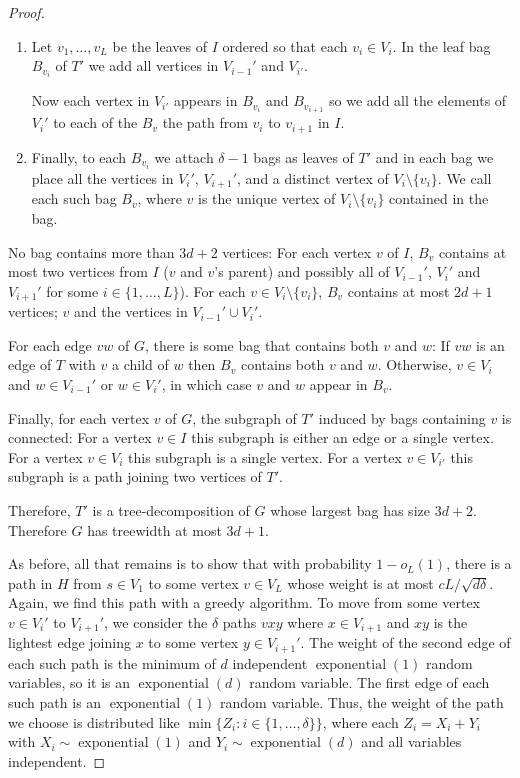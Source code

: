 \documentclass{patmorin}
\DeclareMathOperator{\exponential}{exponential}
\begin{document}
\begin{proof}
\begin{enumerate}
    \item Let $v_1,\ldots,v_L$ be the
     leaves of $I$ ordered so that each $v_i\in V_i$. In the leaf bag
     $B_{v_i}$ of $T'$ we add all vertices in
     $V_{i-1}'$ and $V_{i'}$.

     Now each vertex in $V_{i'}$ appears in $B_{v_i}$ and $B_{v_{i+1}}$
     so we add all the elements of $V_i'$ to each of the $B_v$ the path
     from $v_i$ to $v_{i+1}$ in $I$.

    \item  Finally, to each $B_{v_i}$ we attach $\delta-1$ bags as leaves
     of $T'$ and in each bag we place all the vertices in $V_i'$,
     $V_{i+1}'$, and a distinct vertex of $V_i\setminus\{v_i\}$. We
     call each such bag $B_v$, where $v$ is the unique vertex of
     $V_i\setminus\{v_i\}$ contained in the bag.
  \end{enumerate}

  No bag contains more than $3d+2$ vertices: For each vertex $v$ of
  $I$, $B_v$ contains at most two vertices from $I$ ($v$ and $v$'s
  parent) and possibly all of $V_{i-1}'$, $V_i'$ and $V_{i+1}'$ for
  some $i\in\{1,\ldots,L\}$).  For each $v\in V_i\setminus\{v_i\}$,
  $B_v$ contains at most $2d+1$ vertices; $v$ and the vertices in
  $V_{i-1}'\cup V_{i}'$.

  For each edge $vw$ of $G$, there is some bag that contains both $v$
  and $w$: If $vw$ is an edge of $T$ with $v$ a child of $w$ then $B_v$
  contains both $v$ and $w$. Otherwise, $v\in V_i$ and $w\in V_{i-1}'$
  or $w\in V_{i}'$, in which case $v$ and $w$ appear in $B_v$.

  Finally, for each vertex $v$ of $G$, the subgraph of $T'$ induced by
  bags containing $v$ is connected: For a vertex $v\in I$ this subgraph
  is either an edge or a single vertex.  For a vertex $v\in V_i$ this
  subgraph is a single vertex.  For a vertex $v\in V_{i'}$ this subgraph
  is a path joining two vertices of $T'$.

  Therefore, $T'$ is a tree-decomposition of $G$ whose largest bag
  has size $3d+2$.  Therefore $G$ has treewidth at most $3d+1$.

  As before, all that remains is to show that with probability $1-o_L(1)$,
  there is a path in $H$ from $s\in V_1$ to some vertex $v\in V_{L}$ whose
  weight is at most $cL/\sqrt{d\delta}$.  
  Again, we find this path with a
  greedy algorithm.  To move from some vertex $v\in V_i'$ to $V_{i+1}'$,
  we consider the $\delta$ paths $vxy$ where $x\in V_{i+1}$ and
  $xy$ is the lightest edge joining $x$ to some vertex $y\in V_{i+1}'$.
  The weight of the second edge of each such path is the minimum of
  $d$ independent $\exponential(1)$ random variables, so it is an
  $\exponential(d)$ random variable.  The first edge of each such path
  is an $\exponential(1)$ random variable.  Thus, the weight of the path
  we choose is distributed like $\min\{Z_i:i\in\{1,\ldots,\delta\}\}$,
  where each $Z_i=X_i+Y_i$ with $X_i\sim \exponential(1)$ and
  $Y_i\sim\exponential(d)$ and all variables independent.


\end{proof}
\end{document}

